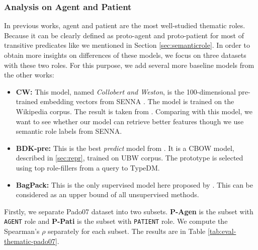 \documentclass[a4paper]{article}
\begin{document}
\subsubsection{Analysis on Agent and Patient} \label{sec:result-thematic-ap}
In previous works, agent and patient are the most well-studied thematic roles. Because it can be clearly defined as proto-agent and proto-patient for most of transitive predicates like we mentioned in Section \ref{sec:semanticrole}. In order to obtain more insights on differences of these models, we focus on three datasets with these two roles. 
For this purpose, we add several more baseline models from the other works: 
\begin{itemize}
  \item \textbf{CW: }   This model, named \textit{Collobert and Weston}, is the 100-dimensional pre-trained embedding vectors from SENNA \citep{collobert2011natural}. The model is trained on the Wikipedia corpus. The result is taken from \citet{baroni2014don}. Comparing with this model, we want to see whether our model can retrieve better features though we use semantic role labels from SENNA. 
  \item \textbf{BDK-pre: }  This is the best \textit{predict} model from \citet{baroni2014don}. It is a CBOW model, described in \ref{sec:repr}, trained on UBW corpus. The prototype is selected using top role-fillers from a query to TypeDM. 
  \item \textbf{BagPack: }  This is the only supervised model here proposed by \citet{herdagdelen2009bagpack}. This can be considered as an upper bound of all unsupervised methods. 
\end{itemize}
Firstly, we separate Pado07 dataset into two subsets. \textbf{P-Agen} is the subset with \texttt{AGENT} role and \textbf{P-Pati} is the subset with \texttt{PATIENT} role. We compute the Spearman's $\rho$ separately for each subset. The results are in Table \ref{tab:eval-thematic-pado07}. 
\end{document}
